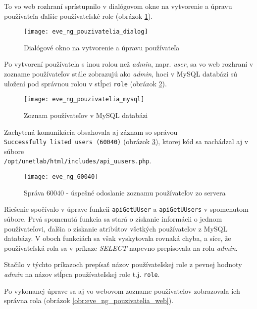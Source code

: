To vo web rozhraní sprístupnilo v dialógovom okne na vytvorenie a úpravu používateľa ďalšie používateľské role (obrázok \ref{obr:eve_ng_pouzivatelia_dialog}).

\begin{figure}
    \centering
    \texttt{[image: eve\_ng\_pouzivatelia\_dialog]}
    \caption{Dialógové okno na vytvorenie a úpravu používateľa}
    \label{obr:eve_ng_pouzivatelia_dialog}
\end{figure}

Po vytvorení používateľa s inou rolou než \emph{admin}, napr. \emph{user}, sa vo web rozhraní v zozname používateľov stále zobrazujú ako \emph{admin}, hoci v MySQL databázi sú uložení pod správnou rolou v stĺpci \texttt{role} (obrázok \ref{obr:eve_ng_pouzivatelia_mysql}).

\begin{figure}
    \centering
    \texttt{[image: eve\_ng\_pouzivatelia\_mysql]}
    \caption{Zoznam používateľov v MySQL databázi}
    \label{obr:eve_ng_pouzivatelia_mysql}
\end{figure}

Zachytená komunikácia obsahovala aj záznam so správou \\
\texttt{Successfully listed users (60040)} (obrázok \ref{obr:eve_ng_60040}),
ktorej kód sa nachádzal aj v súbore \\
\texttt{/opt/unetlab/html/includes/api\_uusers.php}.

\begin{figure}
    \centering
    \texttt{[image: eve\_ng\_60040]}
    \caption{Správa 60040 - úspešné odoslanie zoznamu používateľov zo servera}
    \label{obr:eve_ng_60040}
\end{figure}

Riešenie spočívalo v úprave funkcii \texttt{apiGetUUser} a \texttt{apiGetUUsers} v spomenutom súbore. Prvá spomenutá funkcia sa stará o získanie informácii o jednom používateľovi, ďalšia o získanie atribútov všetkých používateľov z MySQL databázy. V oboch funkciách sa však vyskytovala rovnaká chyba, a síce, že používateľská rola sa v príkaze \emph{SELECT} napevno prepisovala na rolu \emph{admin}.

Stačilo v týchto príkazoch prepísať názov používateľskej role z pevnej hodnoty \emph{admin} na názov stĺpca používateľskej role t.j. \texttt{role}.

Po vykonanej úprave sa aj vo webovom zozname používateľov zobrazovala ich správna rola (obrázok \ref{obr:eve_ng_pouzivatelia_web}).

